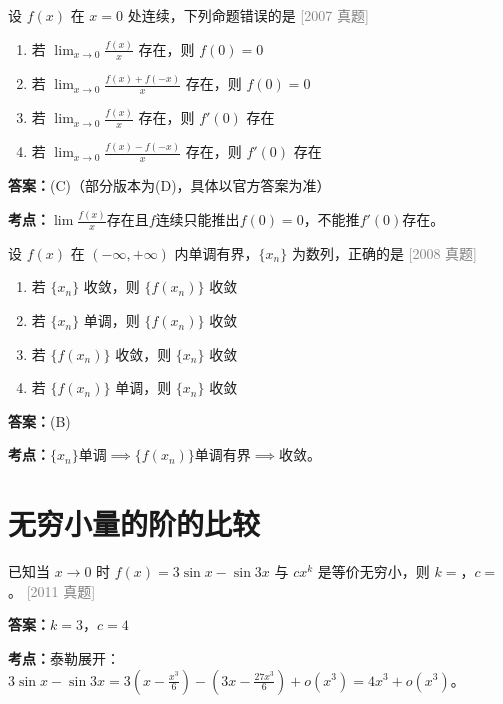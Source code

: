 \documentclass[12pt,a4paper]{ctexbook}
\newcommand{\src}[1]{\hfill\textcolor{gray}{\small\textsf{[#1]}}}
\newcommand{\ans}[1]{\begin{answerbox}\textbf{答案：}#1\end{answerbox}}
\newcommand{\kpt}[1]{\textbf{考点：}#1}
\begin{document}
\begin{exercise}[2007 数学二·第4题]
设 $f(x)$ 在 $x=0$ 处连续，下列命题错误的是 \hfill\src{2007 真题}
\begin{enumerate}[label=(\Alph*),nosep]
  \item 若 $\lim_{x\to 0}\frac{f(x)}{x}$ 存在，则 $f(0)=0$
  \item 若 $\lim_{x\to 0}\frac{f(x)+f(-x)}{x}$ 存在，则 $f(0)=0$
  \item 若 $\lim_{x\to 0}\frac{f(x)}{x}$ 存在，则 $f'(0)$ 存在
  \item 若 $\lim_{x\to 0}\frac{f(x)-f(-x)}{x}$ 存在，则 $f'(0)$ 存在
\end{enumerate}
\end{exercise}
\ans{(C)（部分版本为(D)，具体以官方答案为准）}
\kpt{$\lim\frac{f(x)}{x}$存在且$f$连续只能推出$f(0)=0$，不能推$f'(0)$存在。}

\bigskip

\begin{exercise}[2008 数学二·第5题]
设 $f(x)$ 在 $(-\infty,+\infty)$ 内单调有界，$\{x_n\}$ 为数列，正确的是 \hfill\src{2008 真题}
\begin{enumerate}[label=(\Alph*),nosep]
  \item 若 $\{x_n\}$ 收敛，则 $\{f(x_n)\}$ 收敛
  \item 若 $\{x_n\}$ 单调，则 $\{f(x_n)\}$ 收敛
  \item 若 $\{f(x_n)\}$ 收敛，则 $\{x_n\}$ 收敛
  \item 若 $\{f(x_n)\}$ 单调，则 $\{x_n\}$ 收敛
\end{enumerate}
\end{exercise}
\ans{(B)}
\kpt{$\{x_n\}$单调$\implies\{f(x_n)\}$单调有界$\implies$收敛。}

\section{无穷小量的阶的比较}

\begin{exercise}[2011 数学二]
已知当 $x\to 0$ 时 $f(x)=3\sin x-\sin 3x$ 与 $cx^k$ 是等价无穷小，则 $k=$\underline{\hspace{0.5cm}}，$c=$\underline{\hspace{0.5cm}}。
\src{2011 真题}
\end{exercise}
\ans{$k=3$，$c=4$}
\kpt{泰勒展开：$3\sin x-\sin3x=3(x-\frac{x^3}{6})-(3x-\frac{27x^3}{6})+o(x^3)=4x^3+o(x^3)$。}

\bigskip
\end{document}

